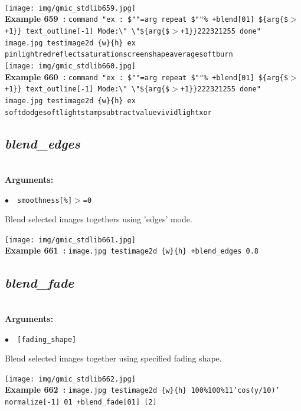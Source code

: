 \documentclass[a4paper,10.5pt,twoside]{book}
\def\comma{\discretionary{,}{}{,}}
\newcommand{\Cb}[1]{\textcolor{cb}{#1}}
\begin{document}
\begin{center}
\\\texttt{[image: img/gmic\_stdlib659.jpg]}\\
{\footnotesize \textbf{Example 659~:} \texttt{command "ex : \$""=arg repeat \$""\% +blend[0{\comma}1] \$\{arg\{\$$>$+1\}\} text\_outline[-1] Mode:\textbackslash " \textbackslash "\$\{arg\{\$$>$+1\}\}{\comma}2{\comma}2{\comma}23{\comma}2{\comma}1{\comma}255 done" image.jpg testimage2d \{w\}{\comma}\{h\} ex pinlight{\comma}red{\comma}reflect{\comma}saturation{\comma}screen{\comma}shapeaverage{\comma}softburn}}
\\\texttt{[image: img/gmic\_stdlib660.jpg]}\\
{\footnotesize \textbf{Example 660~:} \texttt{command "ex : \$""=arg repeat \$""\% +blend[0{\comma}1] \$\{arg\{\$$>$+1\}\} text\_outline[-1] Mode:\textbackslash " \textbackslash "\$\{arg\{\$$>$+1\}\}{\comma}2{\comma}2{\comma}23{\comma}2{\comma}1{\comma}255 done" image.jpg testimage2d \{w\}{\comma}\{h\} ex softdodge{\comma}softlight{\comma}stamp{\comma}subtract{\comma}value{\comma}vividlight{\comma}xor}}
\end{center}

\subsection{\emph{blend\_edges} }\vspace*{-0.7em}
~\\\textbf{\Cb{Arguments: }}\begin{flushleft}
{\small \Cb{\hspace*{0.5cm}$\bullet$~~\texttt{smoothness[\%]$>$=0}}}\end{flushleft}
Blend selected images togethers using 'edges' mode.
\begin{center}\texttt{[image: img/gmic\_stdlib661.jpg]}\\
{\footnotesize \textbf{Example 661~:} \texttt{image.jpg testimage2d \{w\}{\comma}\{h\} +blend\_edges 0.8}}
\end{center}

\subsection{\emph{blend\_fade} }\vspace*{-0.7em}
~\\\textbf{\Cb{Arguments: }}\begin{flushleft}
{\small \Cb{\hspace*{0.5cm}$\bullet$~~\texttt{[fading\_shape]}}}\end{flushleft}
Blend selected images together using specified fading shape.
\begin{center}\texttt{[image: img/gmic\_stdlib662.jpg]}\\
{\footnotesize \textbf{Example 662~:} \texttt{image.jpg testimage2d \{w\}{\comma}\{h\} 100\%{\comma}100\%{\comma}1{\comma}1{\comma}'cos(y/10)' normalize[-1] 0{\comma}1 +blend\_fade[0{\comma}1] [2]}}
\end{center}
\end{document}

